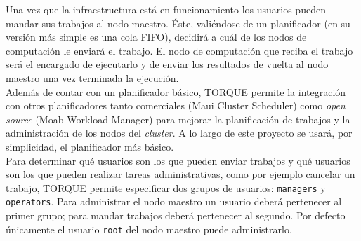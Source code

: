 Una vez que la infraestructura está en funcionamiento los usuarios pueden mandar sus trabajos al nodo maestro. Éste, valiéndose de un planificador (en su versión más simple es una cola FIFO), decidirá a cuál de los nodos de computación le enviará el trabajo. El nodo de computación que reciba el trabajo será el encargado de ejecutarlo y de enviar los resultados de vuelta al nodo maestro una vez terminada la ejecución. \\

Además de contar con un planificador básico, TORQUE permite la integración con otros planificadores tanto comerciales (Maui Cluster Scheduler) como \emph{open source} (Moab Workload Manager) para mejorar la planificación de trabajos y la administración de los nodos del \emph{cluster}. A lo largo de este proyecto se usará, por simplicidad, el planificador más básico. \\

Para determinar qué usuarios son los que pueden enviar trabajos y qué usuarios son los que pueden realizar tareas administrativas, como por ejemplo cancelar un trabajo, TORQUE permite especificar dos grupos de usuarios: \texttt{managers} y \texttt{operators}. Para administrar el nodo maestro un usuario deberá pertenecer al primer grupo; para mandar trabajos deberá pertenecer al segundo. Por defecto únicamente el usuario \texttt{root} del nodo maestro puede administrarlo.

